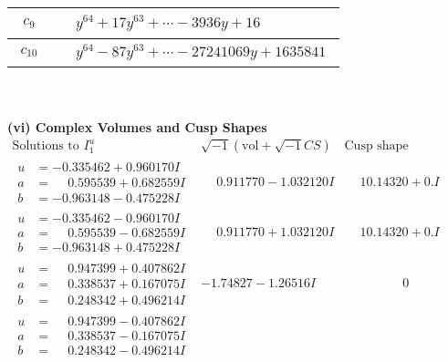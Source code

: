 \documentclass[1p]{elsarticle_modified}
\theoremstyle{definition}
\newcommand{\I}{\sqrt{-1}}
\begin{document}
\begin{tabular}{m{50pt}|m{274pt}}
\hline $$\begin{aligned}c_{9}\end{aligned}$$&$\begin{aligned}
&y^{64}+17 y^{63}+\cdots-3936 y+16
\end{aligned}$\\
\hline $$\begin{aligned}c_{10}\end{aligned}$$&$\begin{aligned}
&y^{64}-87 y^{63}+\cdots-27241069 y+1635841
\end{aligned}$\\
\hline
\end{tabular}\\~\\
\newpage\flushleft \textbf{(vi) Complex Volumes and Cusp Shapes}
$$\begin{array}{c|c|c}  
\text{Solutions to }I^u_{1}& \I (\text{vol} + \sqrt{-1}CS) & \text{Cusp shape}\\
 \hline 
\begin{aligned}
u &= -0.335462 + 0.960170 I \\
a &= \phantom{-}0.595539 + 0.682559 I \\
b &= -0.963148 - 0.475228 I\end{aligned}
 & \phantom{-}0.911770 - 1.032120 I & \phantom{-}10.14320 + 0. I\phantom{ +0.000000I} \\ \hline\begin{aligned}
u &= -0.335462 - 0.960170 I \\
a &= \phantom{-}0.595539 - 0.682559 I \\
b &= -0.963148 + 0.475228 I\end{aligned}
 & \phantom{-}0.911770 + 1.032120 I & \phantom{-}10.14320 + 0. I\phantom{ +0.000000I} \\ \hline\begin{aligned}
u &= \phantom{-}0.947399 + 0.407862 I \\
a &= \phantom{-}0.338537 + 0.167075 I \\
b &= \phantom{-}0.248342 + 0.496214 I\end{aligned}
 & -1.74827 - 1.26516 I & \phantom{-0.000000 } 0 \\ \hline\begin{aligned}
u &= \phantom{-}0.947399 - 0.407862 I \\
a &= \phantom{-}0.338537 - 0.167075 I \\
b &= \phantom{-}0.248342 - 0.496214 I\end{aligned}

\end{array}$$
\end{document}
